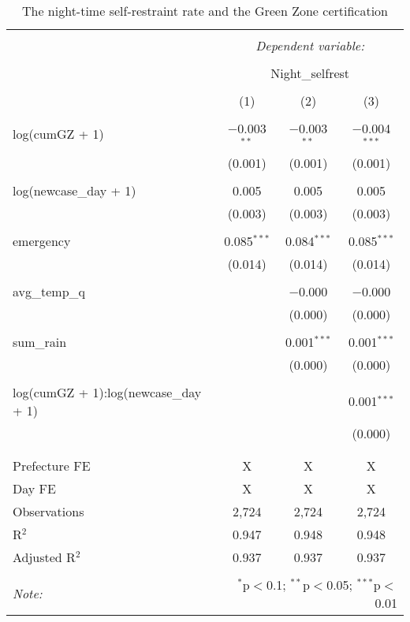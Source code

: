 
\begin{table}[!htbp] \centering 
  \caption{The night-time self-restraint rate and the Green Zone certification} 
  \label{} 
\begin{tabular}{@{\extracolsep{5pt}}lccc} 
\\[-1.8ex]\hline 
\hline \\[-1.8ex] 
 & \multicolumn{3}{c}{\textit{Dependent variable:}} \\ 
\cline{2-4} 
\\[-1.8ex] & \multicolumn{3}{c}{Night\_selfrest} \\ 
\\[-1.8ex] & (1) & (2) & (3)\\ 
\hline \\[-1.8ex] 
 log(cumGZ + 1) & $-$0.003$^{**}$ & $-$0.003$^{**}$ & $-$0.004$^{***}$ \\ 
  & (0.001) & (0.001) & (0.001) \\ 
  & & & \\ 
 log(newcase\_day + 1) & 0.005 & 0.005 & 0.005 \\ 
  & (0.003) & (0.003) & (0.003) \\ 
  & & & \\ 
 emergency & 0.085$^{***}$ & 0.084$^{***}$ & 0.085$^{***}$ \\ 
  & (0.014) & (0.014) & (0.014) \\ 
  & & & \\ 
 avg\_temp\_q &  & $-$0.000 & $-$0.000 \\ 
  &  & (0.000) & (0.000) \\ 
  & & & \\ 
 sum\_rain &  & 0.001$^{***}$ & 0.001$^{***}$ \\ 
  &  & (0.000) & (0.000) \\ 
  & & & \\ 
 log(cumGZ + 1):log(newcase\_day + 1) &  &  & 0.001$^{***}$ \\ 
  &  &  & (0.000) \\ 
  & & & \\ 
\hline \\[-1.8ex] 
Prefecture FE & X & X & X \\ 
Day FE & X & X & X \\ 
Observations & 2,724 & 2,724 & 2,724 \\ 
R$^{2}$ & 0.947 & 0.948 & 0.948 \\ 
Adjusted R$^{2}$ & 0.937 & 0.937 & 0.937 \\ 
\hline 
\hline \\[-1.8ex] 
\textit{Note:}  & \multicolumn{3}{r}{$^{*}$p$<$0.1; $^{**}$p$<$0.05; $^{***}$p$<$0.01} \\ 
\end{tabular} 
\end{table} 
